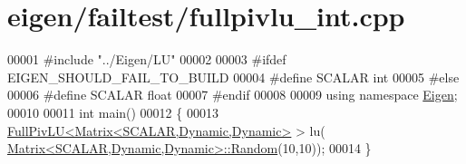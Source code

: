 \hypertarget{eigen_2failtest_2fullpivlu__int_8cpp_source}{}\section{eigen/failtest/fullpivlu\+\_\+int.cpp}
\label{eigen_2failtest_2fullpivlu__int_8cpp_source}

\begin{DoxyCode}
00001 \textcolor{preprocessor}{#include "../Eigen/LU"}
00002 
00003 \textcolor{preprocessor}{#ifdef EIGEN\_SHOULD\_FAIL\_TO\_BUILD}
00004 \textcolor{preprocessor}{#define SCALAR int}
00005 \textcolor{preprocessor}{#else}
00006 \textcolor{preprocessor}{#define SCALAR float}
00007 \textcolor{preprocessor}{#endif}
00008 
00009 \textcolor{keyword}{using namespace }\hyperlink{namespace_eigen}{Eigen};
00010 
00011 \textcolor{keywordtype}{int} main()
00012 \{
00013   \hyperlink{group___l_u___module_class_eigen_1_1_full_piv_l_u}{FullPivLU<Matrix<SCALAR,Dynamic,Dynamic>} > lu(
      \hyperlink{group___core___module_class_eigen_1_1_matrix}{Matrix<SCALAR,Dynamic,Dynamic>::Random}(10,10));
00014 \}
\end{DoxyCode}
